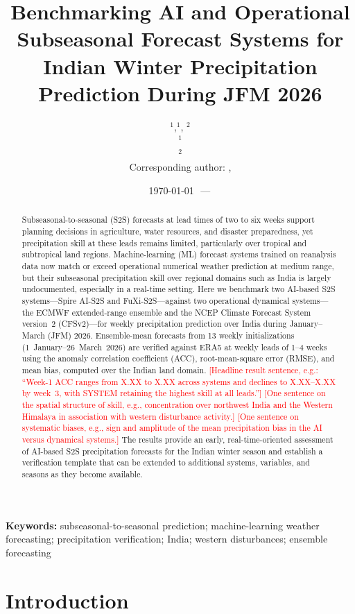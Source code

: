 \documentclass[11pt]{article}
\title{\bfseries Benchmarking AI and Operational Subseasonal Forecast
Systems for Indian Winter Precipitation Prediction During JFM 2026}
\author{%
  \ph{Author One}$^{1}$,\quad \ph{Author Two}$^{1}$,\quad
  \ph{Author Three}$^{2}$\\[6pt]
  $^{1}$\ph{Department, Institution, City, Country}\\
  $^{2}$\ph{Department, Institution, City, Country}\\[4pt]
  \normalsize Corresponding author: \ph{name}, \texttt{\ph{email@institution.edu}}
}
\date{\today\ \,---\, \ph{Draft v0.1; all numerical results are
placeholders pending computation. Not for distribution.}}
\newcommand{\ph}[1]{\textcolor{red}{[#1]}}
\begin{document}
\maketitle

\begin{abstract}
\noindent
Subseasonal-to-seasonal (S2S) forecasts at lead times of two to six
weeks support planning decisions in agriculture, water resources, and
disaster preparedness, yet precipitation skill at these leads remains
limited, particularly over tropical and subtropical land regions.
Machine-learning (ML) forecast systems trained on reanalysis data now
match or exceed operational numerical weather prediction at medium
range, but their subseasonal precipitation skill over regional domains
such as India is largely undocumented, especially in a real-time
setting. Here we benchmark two AI-based S2S systems---Spire AI-S2S and
FuXi-S2S---against two operational dynamical systems---the ECMWF
extended-range ensemble and the NCEP Climate Forecast System version~2
(CFSv2)---for weekly precipitation prediction over India during
January--March (JFM) 2026. Ensemble-mean forecasts from 13 weekly
initializations (1~January--26~March~2026) are verified against ERA5 at
weekly leads of 1--4 weeks using the anomaly correlation coefficient
(ACC), root-mean-square error (RMSE), and mean bias, computed over the
Indian land domain.
\ph{Headline result sentence, e.g.: ``Week-1 ACC ranges from X.XX to
X.XX across systems and declines to X.XX--X.XX by week~3, with SYSTEM
retaining the highest skill at all leads.''}
\ph{One sentence on the spatial structure of skill, e.g., concentration
over northwest India and the Western Himalaya in association with
western disturbance activity.}
\ph{One sentence on systematic biases, e.g., sign and amplitude of the
mean precipitation bias in the AI versus dynamical systems.}
The results provide an early, real-time-oriented assessment of AI-based
S2S precipitation forecasts for the Indian winter season and establish
a verification template that can be extended to additional systems,
variables, and seasons as they become available.
\end{abstract}

\vspace{0.5em}
\noindent\textbf{Keywords:} subseasonal-to-seasonal prediction;
machine-learning weather forecasting; precipitation verification;
India; western disturbances; ensemble forecasting

\section{Introduction}\label{sec:intro}
\end{document}
